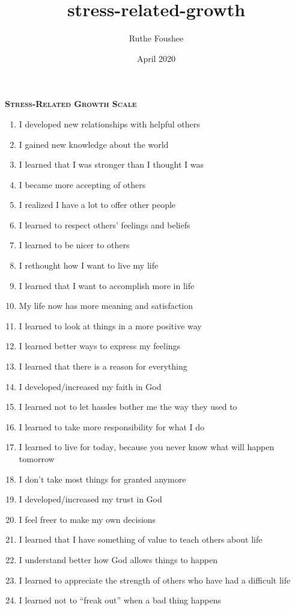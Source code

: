 \documentclass[14pt, a1paper]{memoir}
\title{stress-related-growth}
\author{Ruthe Foushee}
\date{April 2020}
\begin{document}
\thispagestyle{empty}
\textbf{\textsc{\Large Stress-Related Growth Scale}}

\vspace{32pt}
\begin{enumerate}
    \item I developed new relationships with helpful others
    \item I gained new knowledge about the world
    \item I learned that I was stronger than I thought I was
    \item I became more accepting of others
    \item I realized I have a lot to offer other people
    \item I learned to respect others’ feelings and beliefs
    \item I learned to be nicer to others
    \item I rethought how I want to live my life
    \item I learned that I want to accomplish more in life
    \item My life now has more meaning and satisfaction
    \item I learned to look at things in a more positive way
    \item I learned better ways to express my feelings
    \item I learned that there is a reason for everything
    \item I developed/increased my faith in God
    \item I learned not to let hassles bother me the way they used to
    \item I learned to take more responsibility for what I do
    \item I learned to live for today‚ because you never know what will happen tomorrow
    \item I don’t take most things for granted anymore
    \item I developed/increased my trust in God
    \item I feel freer to make my own decisions
    \item I learned that I have something of value to teach others about life
    \item I understand better how God allows things to happen
    \item I learned to appreciate the strength of others who have had a difficult life
    \item I learned not to ``freak out'' when a bad thing happens

\end{enumerate}
\end{document}
